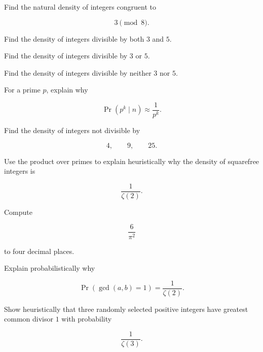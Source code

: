 \begin{exercise}[1]
Find the natural density of integers congruent to

\[ 3\pmod8. \]
\end{exercise}

\begin{exercise}[2]
Find the density of integers divisible by both \(3\) and \(5\).
\end{exercise}

\begin{exercise}[2]
Find the density of integers divisible by \(3\) or \(5\).
\end{exercise}

\begin{exercise}[2]
Find the density of integers divisible by neither \(3\) nor \(5\).
\end{exercise}

\begin{exercise}[2]
For a prime \(p\), explain why

\[ \Pr(p^k\mid n)\approx\frac1{p^k}. \]
\end{exercise}

\begin{exercise}[2]
Find the density of integers not divisible by

\[ 4,\qquad9,\qquad25. \]
\end{exercise}

\begin{exercise}[2]
Use the product over primes to explain heuristically why the density of
squarefree integers is

\[ \frac1{\zeta(2)}. \]
\end{exercise}

\begin{exercise}[1]
Compute

\[ \frac6{\pi^2} \]

to four decimal places.
\end{exercise}

\begin{exercise}[2]
Explain probabilistically why

\[ \Pr(\gcd(a,b)=1)=\frac1{\zeta(2)}. \]
\end{exercise}

\begin{exercise}[2]
Show heuristically that three randomly selected positive integers have
greatest common divisor \(1\) with probability

\[ \frac1{\zeta(3)}. \]
\end{exercise}

